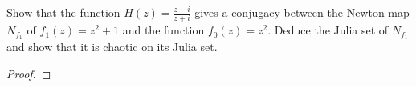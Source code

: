 \begin{problem}{4}
  Show that the function $\displaystyle H(z) = \frac{z-i}{z+i}$ gives a conjugacy between
  the Newton map $N_{f_1}$ of $f_1(z) = z^2 + 1$ and the function $f_0(z) = z^2$. Deduce
  the Julia set of $N_{f_1}$ and show that it is chaotic on its Julia set.
\end{problem}

\begin{proof}
\end{proof}
\newpage
